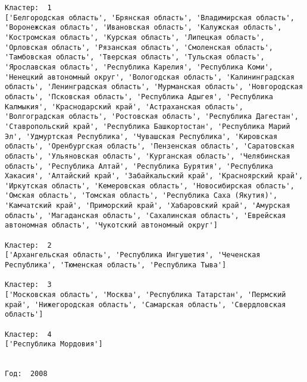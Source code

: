 \documentclass[11pt]{article}
\begin{document}
\begin{Verbatim}[commandchars=\\\{\}]
Кластер:  1
['Белгородская область', 'Брянская область', 'Владимирская область', 'Воронежская область', 'Ивановская область', 'Калужская область', 'Костромская область', 'Курская область', 'Липецкая область', 'Орловская область', 'Рязанская область', 'Смоленская область', 'Тамбовская область', 'Тверская область', 'Тульская область', 'Ярославская область', 'Республика Карелия', 'Республика Коми', 'Ненецкий автономный округ', 'Вологодская область', 'Калинингpадская область', 'Ленинградская область', 'Мурманская область', 'Новгородская область', 'Псковская область', 'Республика Адыгея', 'Республика Калмыкия', 'Краснодарский край', 'Астраханская область', 'Волгоградская область', 'Ростовская область', 'Республика Дагестан', 'Ставропольский край', 'Республика Башкортостан', 'Республика Марий Эл', 'Удмуртская Республика', 'Чувашская Республика', 'Кировская область', 'Оренбургская область', 'Пензенская область', 'Саратовская область', 'Ульяновская область', 'Курганская область', 'Челябинская область', 'Республика Алтай', 'Республика Бурятия', 'Республика Хакасия', 'Алтайский край', 'Забайкальский край', 'Красноярский край', 'Иркутская область', 'Кемеровская область', 'Новосибирская область', 'Омская область', 'Томская область', 'Республика Саха (Якутия)', 'Камчатский край', 'Приморский край', 'Хабаровский край', 'Амурская область', 'Магаданская область', 'Сахалинская область', 'Еврейская автономная область', 'Чукотский автономный округ']

Кластер:  2
['Архангельская область', 'Республика Ингушетия', 'Чеченская Республика', 'Тюменская область', 'Республика Тыва']

Кластер:  3
['Московская область', 'Москва', 'Республика Татарстан', 'Пермский край', 'Нижегородская область', 'Самарская область', 'Свердловская область']

Кластер:  4
['Республика Мордовия']


Год:  2008


\end{Verbatim}
\end{document}
